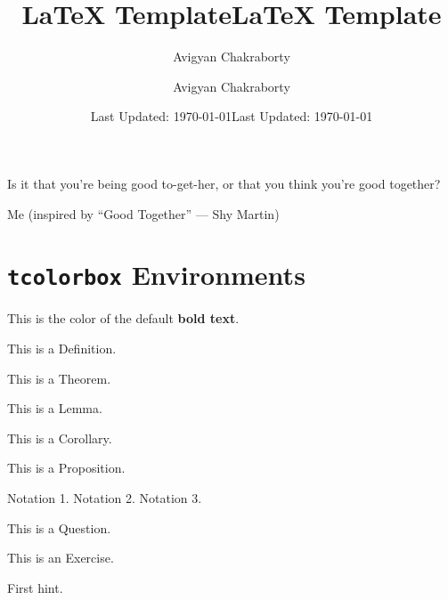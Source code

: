 \documentclass[12pt]{scrartcl}
\title{\textcolor{bubured}{LaTeX Template}}
\author{\textcolor{bubupink}{Avigyan Chakraborty}}
\date{\textcolor{bubucream}{Last Updated: \today}}
\begin{document}
\maketitle

\title{LaTeX Template}
\author{Avigyan Chakraborty}
\date{Last Updated: \today}

\epigraph{Is it that you're being good to-get-her,
or that you think you're good
together?}{Me (inspired
by “Good Together” --- Shy Martin)}

\tableofcontents

\newpage


\section{\texttt{tcolorbox} Environments}


This is the color of the default \textbf{bold text}.

\begin{definition}
[Name]
This is a Definition.
\end{definition}

\begin{theorem}
[Name]
This is a Theorem.
\end{theorem}

\begin{lemma}
[Name]
This is a Lemma.
\end{lemma}

\begin{corollary}
[Name]
This is a Corollary.
\end{corollary}

\begin{proposition}
[Name]
This is a Proposition.
\end{proposition}

\begin{notation}
  \begin{itemize}
    \ii Notation 1.
    \ii Notation 2.
    \ii Notation 3.
  \end{itemize}
\end{notation}

\begin{ques}
[Name]
This is a Question.
\end{ques}

\begin{exercise}
[Name]
This is an Exercise.
\end{exercise}
\begin{hints}
  \begin{hint}
    First hint.
  \end{hint}
\end{hints}
\end{document}
